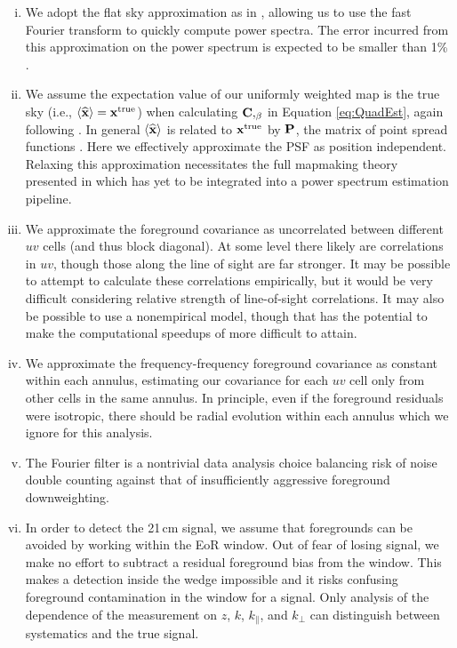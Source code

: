 \begin{enumerate}[i.]
\item We adopt the flat sky approximation as in \citet{DillonFast,X13}, allowing us to use the fast Fourier transform to quickly compute power spectra. The error incurred from this approximation on the power spectrum is expected to be smaller than 1\% \citep{X13}.

\item We assume the expectation value of our uniformly weighted map is the true sky (i.e., $\langle \widehat{\mathbf{x}} \rangle = \mathbf{x}^\text{true}$) when calculating $\mathbf{C},_\beta$ in Equation \ref{eq:QuadEst}, again following \citet{X13}. In general $\langle \widehat{\mathbf{x}} \rangle$ is related to $\mathbf{x}^\text{true}$ by $\mathbf{P}$, the matrix of point spread functions \citep{dillonmapmaking}. Here we effectively approximate the PSF as position independent. Relaxing this approximation necessitates the full mapmaking theory presented in \citet{dillonmapmaking} which has yet to be integrated into a power spectrum estimation pipeline. 

\item We approximate the foreground covariance as uncorrelated between different $uv$ cells (and thus block diagonal). At some level there likely are correlations in $uv$, though those along the line of sight are far stronger. It may be possible to attempt to calculate these correlations empirically, but it would be very difficult considering relative strength of line-of-sight correlations. It may also be possible to use a nonempirical model, though that has the potential to make the computational speedups of \citet{DillonFast} more difficult to attain.
 
\item We approximate the frequency-frequency foreground covariance as constant within each annulus, estimating our covariance for each $uv$ cell only from other cells in the same annulus. In principle, even if the foreground residuals were isotropic, there should be radial evolution within each annulus which we ignore for this analysis. 

\item The Fourier filter is a nontrivial data analysis choice balancing risk of noise double counting against that of insufficiently aggressive foreground downweighting.

\item In order to detect the 21\,cm signal, we assume that foregrounds can be avoided by working within the EoR window. Out of fear of losing signal, we make no effort to subtract a residual foreground bias from the window. This makes a detection inside the wedge impossible and it risks confusing foreground contamination in the window for a signal. Only analysis of the dependence of the measurement on $z$, $k$, $k_\|$, and $k_\perp$ can distinguish between systematics and the true signal. 

\end{enumerate}

